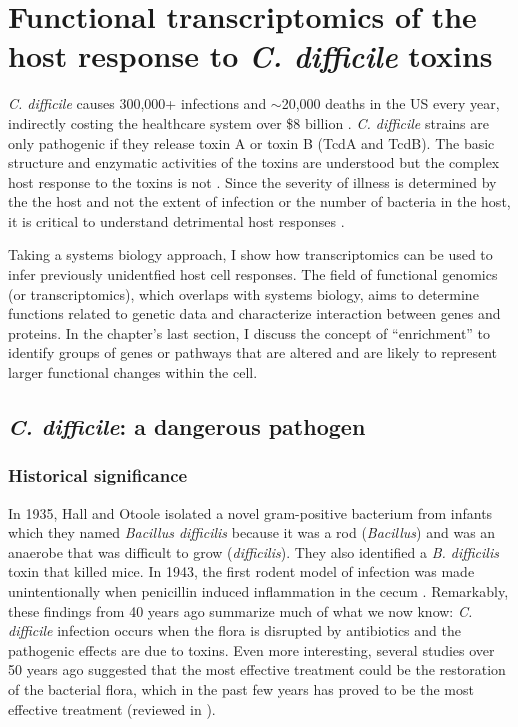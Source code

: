 \chapter[Functional transcriptomics of toxin response]{Functional transcriptomics of the host response to \textit{C. difficile} toxins}\label{chapter:introbmc}

\textit{C. difficile} causes 300,000+ infections and $\sim$20,000 deaths in the US every year,
indirectly costing the healthcare system over \${}8 billion \cite{Lucado:2012wl}.
\textit{C. difficile} strains are only pathogenic if
they release toxin A or toxin B (TcdA and TcdB).
The basic structure and enzymatic activities of the toxins
are understood but the complex host response to the toxins
is not \cite{Pruitt:2010cy,Pruitt:2012kx,Genisyuerek:2011dr,
Just:1995kz,Just:1995ei,Sun:2010kt}. 
Since the severity of illness is determined
by the the host and not the extent of infection
or the number of bacteria in the host, it is critical
to understand detrimental host responses \cite{ElFeghaly:2013gq}.

Taking a systems biology approach, I show how transcriptomics
can be used to infer previously unidentfied host cell responses.
The field of functional genomics (or transcriptomics), which overlaps
with systems biology, aims to determine functions related to genetic data
and characterize interaction between genes and proteins. In the chapter's last section, I
discuss the concept of ``enrichment'' to identify
groups of genes or pathways that are altered 
and are likely to represent larger functional changes within the cell.

\section{\textit{C. difficile}: a dangerous pathogen}

\subsection{Historical significance}

In 1935, Hall and Otoole isolated a novel gram-positive bacterium from infants which
they named \textit{Bacillus difficilis} because it was a rod (\textit{Bacillus})
and was an anaerobe that was difficult to grow (\textit{difficilis}). 
They also identified a \textit{B. difficilis} toxin that killed mice.
In 1943, the first rodent model of infection was made unintentionally
when penicillin induced inflammation in the cecum \cite{Hamre:1943te}.
Remarkably, these findings from 40 years ago summarize
much of what we now know: \textit{C. difficile} infection occurs
when the flora is disrupted by antibiotics and the pathogenic
effects are due to toxins. Even more interesting, several
studies over 50 years ago suggested that the most effective treatment
could be the restoration of the bacterial flora, which
in the past few years has proved to be the most effective 
treatment (reviewed in \cite{Bartlett:2008jx}).

